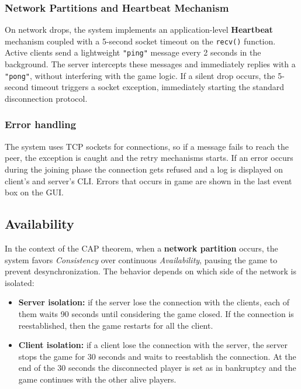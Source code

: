 \documentclass{scrartcl}
\begin{document}
\subsubsection{Network Partitions and Heartbeat Mechanism}
On network drops, the system implements an application-level \textbf{Heartbeat} mechanism coupled
with a 5-second socket timeout on the \texttt{recv()} function.
Active clients send a lightweight \texttt{"ping"} message every 2 seconds in the background.
The server intercepts these messages and immediately replies with a \texttt{"pong"}, without interfering with the game logic.
If a silent drop occurs, the 5-second timeout triggers a socket exception, immediately starting the standard disconnection protocol.

\subsubsection{Error handling}
The system uses TCP sockets for connections, so if a message fails to reach the peer, the exception is caught and the retry mechanisms starts.
If an error occurs during the joining phase the connection gets refused and a log is displayed on client's and server's CLI.
Errors that occurs in game are shown in the last event box on the GUI.

\subsection{Availability}\label{availability}

In the context of the CAP theorem, when a \textbf{network partition} occurs,
the system favors \textit{Consistency} over continuous \textit{Availability}, pausing the game to prevent desynchronization.
The behavior depends on which side of the network is isolated:
\begin{itemize}
    \item \textbf{Server isolation:} if the server lose the connection with the clients,
    each of them waits 90 seconds until considering the game closed.
    If the connection is reestablished, then the game restarts for all the client.
    \item \textbf{Client isolation:} if a client lose the connection with the server,
    the server stops the game for 30 seconds and waits to reestablish the connection.
    At the end of the 30 seconds the disconnected player is set as in bankruptcy and the game continues with the other alive players.
\end{itemize}
\end{document}
